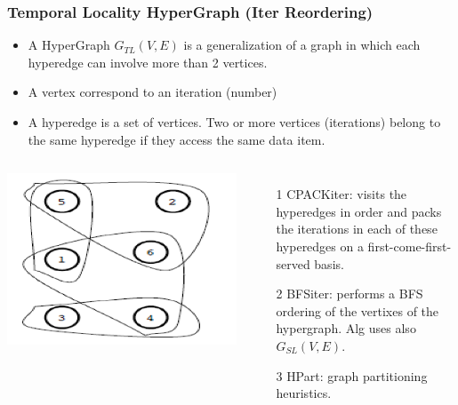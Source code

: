 \documentclass{beamer}
\newcommand{\emp}[1]{\textcolor{DikuRed}{ #1}}
\begin{document}
\begin{frame}[fragile,t]
  \frametitle{Temporal Locality HyperGraph (Iter Reordering)}

\begin{itemize}
    \item A HyperGraph $G_{TL}(V,E)$ is a generalization of a graph in which
            each hyperedge can involve more than 2 vertices.
    \item A vertex correspond to an iteration (number)
    \item A hyperedge is a set of vertices. Two or more
            vertices (iterations) belong to the same hyperedge 
            if they access the same data item.
\end  {itemize}

\begin{columns}
\includegraphics[width=33ex]{Figures/TempLocHyper}
\begin{itemize}
\item[1] \emp{CPACKiter}: visits the hyperedges in order
            and packs the iterations in each of these hyperedges on a
            first-come-first-served basis.\smallskip

\item[2] \emp{BFSiter}: performs a BFS ordering of the vertixes
            of the hypergraph. Alg uses also $G_{SL}(V,E)$.\smallskip

\item[3] \emp{HPart}: graph partitioning heuristics.
\end{itemize}
\end{columns}

 
\end{frame}
\end{document}
